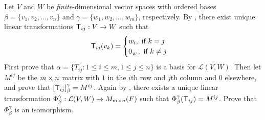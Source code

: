 \begin{exercise} \label{exercise 2.4.21}
Let \(V\) and \(W\) be \emph{finite}-dimensional vector spaces with ordered bases \(\beta = \{ v_1, v_2, ..., v_n \}\) and \(\gamma = \{ w_1, w_2, ..., w_m \}\), respectively.
By , there exist unique linear transformations \(\textsf{T}_{ij} : V \to W\) such that
\begin{equation*}
    \textsf{T}_{ij}(v_k) = \begin{cases}
        w_i, \text{ if } k = j \\
        0_{_W}, \text{ if } k \ne j
    \end{cases}
\end{equation*}
First prove that \(\alpha = \{ T_{ij} : 1 \le i \le m, 1 \le j \le n \}\) is a basis for \(\mathcal{L}(V, W)\).
Then let \(M^{ij}\) be the \(m \times n\) matrix with \(1\) in the \(i\)th row and \(j\)th column and \(0\) elsewhere, and prove that \([\textsf{T}_{ij}]_{\beta}^{\gamma} = M^{ij}\).
Again by , there exists a unique linear transformation \(\Phi_{\beta}^{\gamma} : \mathcal{L}(V, W) \to M_{m \times n}(F)\) such that \(\Phi_{\beta}^{\gamma} (\textsf{T}_{ij}) = M^{ij}\).
Prove that \(\Phi_{\beta}^{\gamma}\) is an isomorphism.
\end{exercise}

